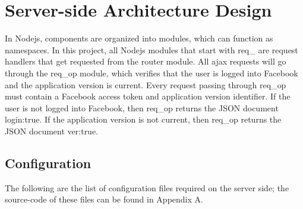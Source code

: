 \section{Server-side Architecture Design}

In Nodejs, components are organized into modules, which can function as namespaces. In this project, all Nodejs modules that start with req{\_} are request handlers that get requested from the router module. All ajax requests will go through the req{\_}op module, which verifies that the user is logged into Facebook and the application version is current. Every request passing through req{\_}op must contain a Facebook access token and application version identifier. If the user is not logged into Facebook, then req{\_}op returns the JSON document {login:true}. If the application version is not current, then req{\_}op returns the JSON document {ver:true}. 

\subsection{Configuration}
The following are the list of configuration files required on the server side; the source-code of these files can be found in Appendix A.

